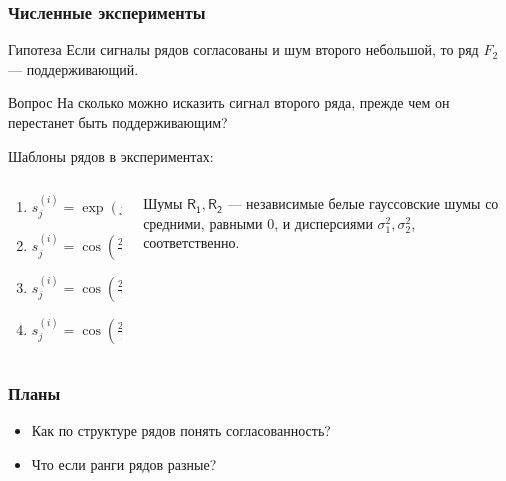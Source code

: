 \documentclass{beamer}
\begin{document}
    \begin{frame}
        \frametitle{Численные эксперименты}
        
        \begin{block}{Гипотеза}
            Если сигналы рядов согласованы и шум второго небольшой, то ряд $F_2$ --- поддерживающий. 
        \end{block}

        \begin{block}{Вопрос}
            На сколько можно исказить сигнал второго ряда, прежде чем он перестанет быть поддерживающим?
        \end{block}

        Шаблоны рядов в экспериментах:
        \begin{columns}
            \begin{column}{0.5\textwidth}
                \begin{enumerate}
                    \item $s^{(i)}_j = \exp(j\lambda_i)$
                    \item $s^{(i)}_j = \cos(\frac{2\pi j}{12})\exp(j\lambda_i)$
                    \item $s^{(i)}_j = \cos(\frac{2\pi j}{T_i})$
                    \item $s^{(i)}_j = \cos(\frac{2\pi j}{12}) + \exp(j\lambda_i)$
                \end{enumerate}
            \end{column}
            \begin{column}{0.5\textwidth}
                Шумы $\mathsf{R_1, R_2}$ --- независимые белые гауссовские шумы со средними, равными 0, и дисперсиями $\sigma_1^2, \sigma_2^2$, соответственно.
            \end{column}
        \end{columns} 
                
    \end{frame}

    \begin{frame}
        \frametitle{Планы}
        \begin{itemize}
            \item Как по структуре рядов понять согласованность?
            \item Что если ранги рядов разные?
        \end{itemize}
    \end{frame}
\end{document}
